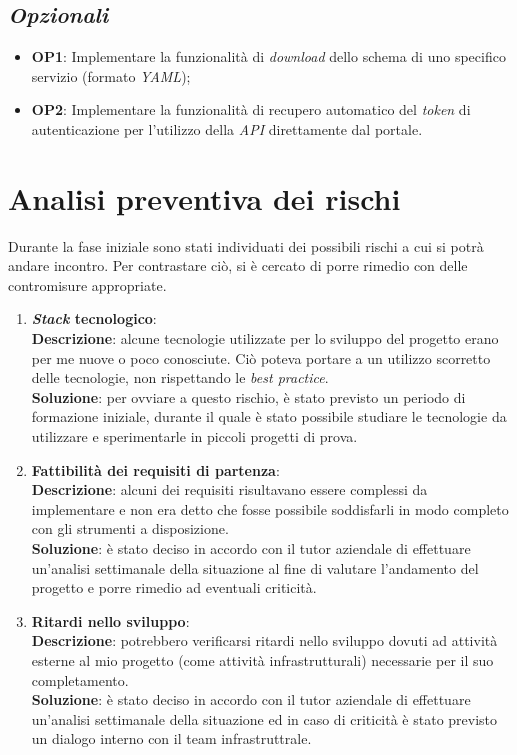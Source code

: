 \subsection*{\emph{Opzionali}}\label{subsec:obiettivi-opzionali}
\begin{itemize}
    \item \textbf{OP1}: Implementare la funzionalità di \textit{download} dello schema di uno specifico servizio (formato \textit{YAML});
    \item \textbf{OP2}: Implementare la funzionalità di recupero automatico del \textit{token} di autenticazione per l'utilizzo della \textit{API} direttamente dal portale.
\end{itemize}

\section{Analisi preventiva dei rischi}\label{sec:analisi-rischi}
Durante la fase iniziale sono stati individuati dei possibili rischi a cui si potrà andare incontro. Per contrastare ciò, si è cercato di porre rimedio con delle contromisure appropriate.
\begin{enumerate}
    \item \textbf{\textit{Stack} tecnologico}:\\
        \textbf{Descrizione}: alcune tecnologie utilizzate per lo sviluppo del progetto erano per me nuove o poco conosciute. Ciò poteva portare a un utilizzo scorretto delle tecnologie, non rispettando le \textit{best practice}.\\
        \textbf{Soluzione}: per ovviare a questo rischio, è stato previsto un periodo di formazione iniziale, durante il quale è stato possibile studiare le tecnologie da utilizzare e sperimentarle in piccoli progetti di prova.\\
    \item \textbf{Fattibilità dei requisiti di partenza}:\\
        \textbf{Descrizione}: alcuni dei requisiti risultavano essere complessi da implementare e non era detto che fosse possibile soddisfarli in modo completo con gli strumenti a disposizione.\\
        \textbf{Soluzione}: è stato deciso in accordo con il tutor aziendale di effettuare un'analisi settimanale della situazione al fine di valutare l'andamento del progetto e porre rimedio ad eventuali criticità.\\ 
    \item \textbf{Ritardi nello sviluppo}:\\
        \textbf{Descrizione}: potrebbero verificarsi ritardi nello sviluppo dovuti ad attività esterne al mio progetto (come attività infrastrutturali) necessarie per il suo completamento.\\
        \textbf{Soluzione}: è stato deciso in accordo con il tutor aziendale di effettuare un'analisi settimanale della situazione ed in caso di criticità è stato previsto un dialogo interno con il team infrastruttrale.\\
\end{enumerate}